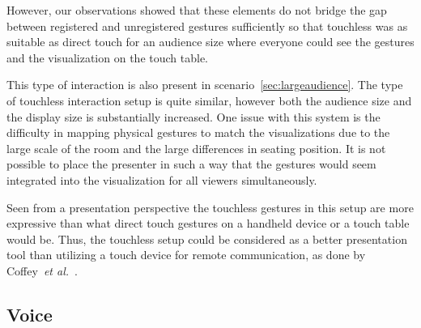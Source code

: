 \documentclass[review,journal]{vgtc}         %
\newcommand{\todo}[1]{\textbf{\textcolor{red}{[TODO: {#1}]}}}
\begin{document}
However, our observations showed that these elements do not bridge the gap between registered and unregistered gestures sufficiently so that touchless was as suitable as direct touch for an audience size where everyone could see the gestures and the visualization on the touch table.

This type of interaction is also present in scenario~\ref{sec:largeaudience}. The type of touchless interaction setup is quite similar, however both the audience size and the display size is substantially increased.
One issue with this system is the difficulty in mapping physical gestures to match the visualizations due to the large scale of the room and the large differences in seating position.
It is not possible to place the presenter in such a way that the gestures would seem integrated into the visualization for all viewers simultaneously.

Seen from a presentation perspective the touchless gestures in this setup are more expressive than what direct touch gestures on a handheld device or a touch table would be.
Thus, the touchless setup could be considered as a better presentation tool than utilizing a touch device for remote communication, as done by Coffey~\textit{et al.}~\cite{Coffey:2012:ISW:2360744.2360843}.





\subsection{Voice}
\end{document}
